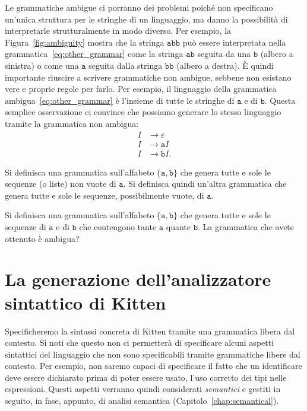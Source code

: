 Le grammatiche ambigue ci porranno dei problemi poich\'e non specificano
un'unica struttura per le stringhe di un linguaggio, ma danno la
possibilit\`a di interpretarle strutturalmente in modo diverso. Per esempio,
la Figura~\ref{fig:ambiguity} mostra che la stringa $\mathtt{abb}$ pu\`o
essere interpretata nella grammatica~\eqref{eq:other_grammar}
come la stringa $\mathtt{ab}$ seguita da una
$\mathtt{b}$ (albero a sinistra)
o come una $\mathtt{a}$ seguita dalla stringa $\mathtt{bb}$ (albero a destra). 
\`E quindi importante riuscire a scrivere grammatiche non ambigue, sebbene
non esistano vere e proprie regole per farlo. Per esempio, il linguaggio
della grammatica ambigua~\eqref{eq:other_grammar}
\`e l'insieme di tutte le stringhe di
$\mathtt{a}$ e di $\mathtt{b}$. Questa semplice osservazione ci
convince che possiamo generare lo stesso linguaggio tramite
la grammatica non ambigua:
%
\begin{align*}
  I&\to\varepsilon\\
  I&\to\mathtt{a}I\\
  I&\to\mathtt{b}I.
\end{align*}
%
\begin{exercise}\label{ex:lists}
Si definisca una grammatica sull'alfabeto $\{\mathtt{a},\mathtt{b}\}$ che
genera tutte e sole le sequenze (o liste) non vuote di $\mathtt{a}$.
Si definisca quindi un'altra grammatica che genera tutte e sole le sequenze,
possibilmente vuote, di $\mathtt{a}$.
\end{exercise}
%
\begin{exercise}\label{ex:as_many_as}
Si definisca una grammatica sull'alfabeto $\{\mathtt{a},\mathtt{b}\}$ che
genera tutte e sole le sequenze di $\mathtt{a}$ e di $\mathtt{b}$ che
contengono tante $\mathtt{a}$ quante $\mathtt{b}$. La grammatica che
avete ottenuto \`e ambigua?
\end{exercise}
%
\section{La generazione dell'analizzatore sintattico di Kitten}
  \label{sec:java_cup}
%
Specificheremo la sintassi concreta di Kitten tramite una grammatica
libera dal contesto. Si noti che questo non ci permetter\`a
di specificare alcuni
aspetti sintattici del linguaggio che non sono specificabili tramite
grammatiche libere dal contesto. Per esempio, non saremo capaci di specificare
il fatto che un identificare deve essere dichiarato prima di poter
essere usato, \nec l'uso corretto dei tipi nelle espressioni. Questi aspetti
verranno quindi considerati \emph{semantici} e gestiti in seguito, in fase,
appunto, di analisi semantica (Capitolo~\ref{chap:semantical}).

